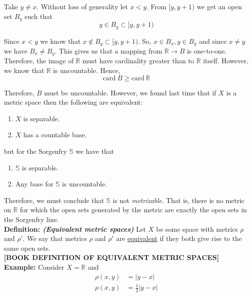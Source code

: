 \documentclass[12pt]{article}
\newlength\tindent
\renewcommand{\indent}{\hspace*{\tindent}}
\newcommand{\R}{\mathbb R}
\newcommand{\card}{\mathrm{card~}}
\begin{document}
\indent Take $y \neq x$. Without loss of generality let $x < y$. From $[y, y + 1)$ we get an open set $B_y$ such that
\begin{equation*}
	y \in B_y \subset [y, y + 1)
\end{equation*}

\indent  Since $x < y$ we know that $x \notin B_y \subset [y, y + 1)$. So, $x \in B_x, y \in B_y$ and since $x \neq y$ we have $B_x \neq B_y$. This gives us that a mapping from $\R \to B$ is one-to-one. Therefore, the image of $\R$ must have cardinality greater than to $\R$ itself. However, we know that $\R$ is uncountable. Hence,
\begin{equation*}
	\card B \geq \card \R
\end{equation*}

\indent Therefore, $B$ must be uncountable. However, we found last time that if $X$ is a metric space then the following are equivalent:
\begin{enumerate}
	\item $X$ is separable.
	\item $X$ has a countable base.
\end{enumerate}

but for the Sorgenfry $\mathbb S$ we have that
\begin{enumerate}
	\item $\mathbb S$ is separable.
	\item Any base for $\mathbb S$ is uncountable.
\end{enumerate}

\indent Therefore, we must conclude that $\mathbb S$ is not {\em metrizable}. That is, there is no metric on $\R$ for which the open sets generated by the metric are exactly the open sets in the Sorgenfry line. \\

%
%
{\bf Definition: {\em (Equivalent metric spaces)}} Let $X$ be some space with metrics $\rho$ and $\rho'$. We say that metrics $\rho$ and $\rho'$ are \underline{equivalent} if they both give rise to the same open sets. \\

{\bf [BOOK DEFINITION OF EQUIVALENT METRIC SPACES]} \\


%
%
{\bf Example:} Consider $X = \R$ and 
\begin{align*}
	\rho(x,y) &= |y - x| \\
	\rho(x,y) &= \frac{1}{2}|y - x|
\end{align*}
\end{document}
